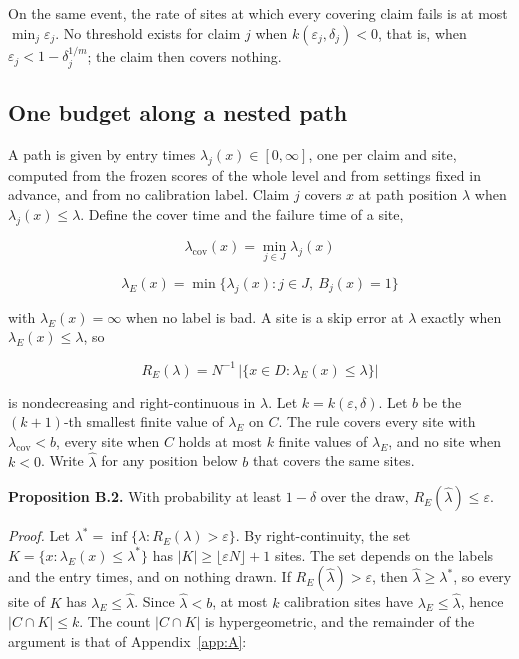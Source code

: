 \documentclass{iopjournal}
\begin{document}
On the same event, the rate of sites at which every covering claim fails is at most \(\min_j \varepsilon_j\). No threshold exists for claim \(j\) when \(k(\varepsilon_j, \delta_j) < 0\), that is, when \(\varepsilon_j < 1 - \delta_j^{1/m}\); the claim then covers nothing.

\hypertarget{one-budget-along-a-nested-path}{%
\subsection{One budget along a nested path}\label{one-budget-along-a-nested-path}}

A path is given by entry times \(\lambda_j(x) \in [0, \infty]\), one per claim and site, computed from the frozen scores of the whole level and from settings fixed in advance, and from no calibration label. Claim \(j\) covers \(x\) at path position \(\lambda\) when \(\lambda_j(x) \le \lambda\). Define the cover time and the failure time of a site,

\[
\lambda_{\mathrm{cov}}(x) = \min_{j \in J} \lambda_j(x)
\]

\[
\lambda_E(x) = \min \{\lambda_j(x) : j \in J,\ B_j(x) = 1\}
\]

with \(\lambda_E(x) = \infty\) when no label is bad. A site is a skip error at \(\lambda\) exactly when \(\lambda_E(x) \le \lambda\), so

\[
R_E(\lambda) = N^{-1} \, \lvert \{x \in D : \lambda_E(x) \le \lambda\} \rvert
\]

is nondecreasing and right-continuous in \(\lambda\). Let \(k = k(\varepsilon, \delta)\). Let \(b\) be the \((k+1)\)-th smallest finite value of \(\lambda_E\) on \(C\). The rule covers every site with \(\lambda_{\mathrm{cov}} < b\), every site when \(C\) holds at most \(k\) finite values of \(\lambda_E\), and no site when \(k < 0\). Write \(\hat\lambda\) for any position below \(b\) that covers the same sites.

\textbf{Proposition B.2.} With probability at least \(1 - \delta\) over the draw, \(R_E(\hat\lambda) \le \varepsilon\).

\emph{Proof.} Let \(\lambda^\ast = \inf\{\lambda : R_E(\lambda) > \varepsilon\}\). By right-continuity, the set \(K = \{x : \lambda_E(x) \le \lambda^\ast\}\) has \(|K| \ge \lfloor \varepsilon N \rfloor + 1\) sites. The set depends on the labels and the entry times, and on nothing drawn. If \(R_E(\hat\lambda) > \varepsilon\), then \(\hat\lambda \ge \lambda^\ast\), so every site of \(K\) has \(\lambda_E \le \hat\lambda\). Since \(\hat\lambda < b\), at most \(k\) calibration sites have \(\lambda_E \le \hat\lambda\), hence \(|C \cap K| \le k\). The count \(|C \cap K|\) is hypergeometric, and the remainder of the argument is that of Appendix~\ref{app:A}:
\end{document}
